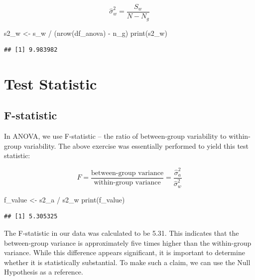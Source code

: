 \documentclass[
]{book}
\newenvironment{Shaded}{\begin{snugshade}}{\end{snugshade}}
\newcommand{\FunctionTok}[1]{\textcolor[rgb]{0.00,0.00,0.00}{#1}}
\newcommand{\NormalTok}[1]{#1}
\newcommand{\OtherTok}[1]{\textcolor[rgb]{0.56,0.35,0.01}{#1}}
\newcommand{\SpecialCharTok}[1]{\textcolor[rgb]{0.00,0.00,0.00}{#1}}
\begin{document}
\[
\hat{\sigma}^2_w = \frac{S_w}{N-N_g}
\]

\begin{Shaded}
\begin{Highlighting}[]
\NormalTok{s2\_w }\OtherTok{\textless{}{-}}\NormalTok{ s\_w }\SpecialCharTok{/}\NormalTok{ (}\FunctionTok{nrow}\NormalTok{(df\_anova) }\SpecialCharTok{{-}}\NormalTok{ n\_g)}
\FunctionTok{print}\NormalTok{(s2\_w)}
\end{Highlighting}
\end{Shaded}

\begin{verbatim}
## [1] 9.983982
\end{verbatim}

\hypertarget{test-statistic-1}{%
\section{Test Statistic}\label{test-statistic-1}}

\hypertarget{f-statistic}{%
\subsection{F-statistic}\label{f-statistic}}

In ANOVA, we use F-statistic -- the ratio of between-group variability to within-group variability. The above exercise was essentially performed to yield this test statistic:

\[
F = \frac{\text{between-group variance}}{\text{within-group variance}} = \frac{\hat{\sigma}^2_a}{\hat{\sigma}^2_w}
\]

\begin{Shaded}
\begin{Highlighting}[]
\NormalTok{f\_value }\OtherTok{\textless{}{-}}\NormalTok{ s2\_a }\SpecialCharTok{/}\NormalTok{ s2\_w}
\FunctionTok{print}\NormalTok{(f\_value)}
\end{Highlighting}
\end{Shaded}

\begin{verbatim}
## [1] 5.305325
\end{verbatim}

The F-statistic in our data was calculated to be 5.31. This indicates that the between-group variance is approximately five times higher than the within-group variance. While this difference appears significant, it is important to determine whether it is statistically substantial. To make such a claim, we can use the Null Hypothesis as a reference.
\end{document}
